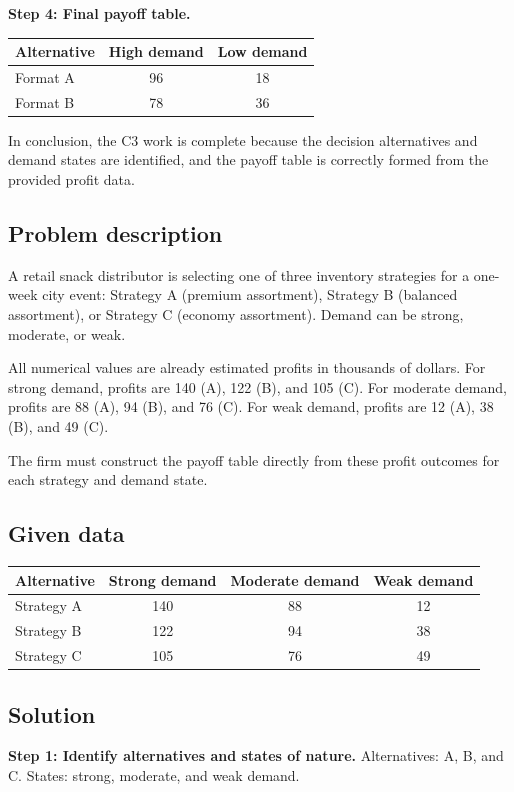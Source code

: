 \begin{ExamProblems}
		\textbf{Step 4: Final payoff table.}
		\begin{center}
			\begin{tabular}{l c c}
				\toprule
				Alternative & High demand & Low demand \\
				\midrule
				Format A & 96 & 18 \\
				Format B & 78 & 36 \\
				\bottomrule
			\end{tabular}
		\end{center}
		
		In conclusion, the C3 work is complete because the decision alternatives and demand states are identified, and the payoff table is correctly formed from the provided profit data.
		
		\item
		\subsection*{Problem description}
		A retail snack distributor is selecting one of three inventory strategies for a one-week city event: Strategy A (premium assortment),
		Strategy B (balanced assortment), or Strategy C (economy assortment). Demand can be strong, moderate, or weak.
		
		All numerical values are already estimated profits in thousands of dollars.
		For strong demand, profits are 140 (A), 122 (B), and 105 (C). For moderate demand, profits are 88 (A), 94 (B), and 76 (C).
		For weak demand, profits are 12 (A), 38 (B), and 49 (C).
		
		The firm must construct the payoff table directly from these profit outcomes for each strategy and demand state.
		\subsection*{Given data}
		\begin{center}
			\begin{tabular}{l c c c}
				\toprule
				Alternative & Strong demand & Moderate demand & Weak demand \\
				\midrule
				Strategy A & 140 & 88 & 12 \\
				Strategy B & 122 & 94 & 38 \\
				Strategy C & 105 & 76 & 49 \\
				\bottomrule
			\end{tabular}
		\end{center}
		
		\subsection*{Solution}
		\textbf{Step 1: Identify alternatives and states of nature.} Alternatives: A, B, and C. States: strong, moderate, and weak demand.
		

\end{ExamProblems}
